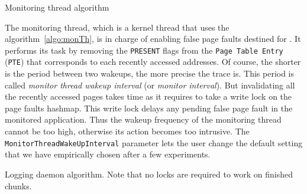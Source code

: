 \begin{algorithm}[htb]
    \caption{Monitoring thread algorithm}
    \label{algo:monTh}
    \begin{algorithmic}[1]
                \State {}
                        \State {}
                        \State {}
                        \State {}
                    \EndFor
                \State {}
            \EndFor
            \State {}
        \EndWhile
    \end{algorithmic}
\end{algorithm}

The monitoring thread, which is a kernel thread that uses the algorithm~\ref{algo:monTh}, is
in charge of enabling false page faults destined for \Moca. It performs its task by
removing the \texttt{PRESENT} flags from the \texttt{Page Table Entry}
(\texttt{PTE}) that corresponds to each recently
accessed addresses. Of course, the 
shorter is the period between two wakeups, the more
precise the trace is.
This period is called \emph{monitor thread wakeup interval} (or \emph{monitor
interval}).
But invalidating all the recently accessed pages takes time as it requires
to take a write lock on the page faults hashmap. This write lock
delays any pending false page fault in the monitored application. Thus the wakeup frequency of the
monitoring thread cannot be too high, otherwise its action becomes too intrusive.
The \texttt{MonitorThreadWakeUpInterval} \Moca parameter lets the user change the default setting
that we have empirically chosen after a few experiments.

\begin{algorithm}[htb]
    \caption{Logging daemon algorithm. Note that no locks are required to
    work on finished chunks.}
    \label{algo:flushTh}
    \begin{algorithmic}[1]
                \State {}
                \State {}
                \EndFor
            \EndFor
            \State {}
        \EndWhile
    \end{algorithmic}
\end{algorithm}

